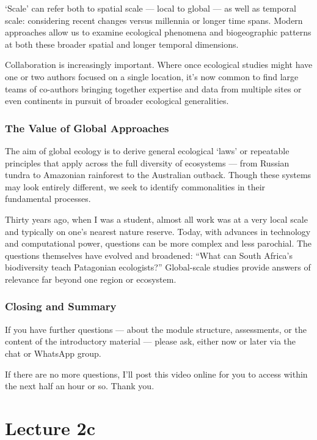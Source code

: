 \documentclass[
  12pt,
]{book}
\begin{document}
`Scale' can refer both to spatial scale --- local to global --- as well
as temporal scale: considering recent changes versus millennia or longer
time spans. Modern approaches allow us to examine ecological phenomena
and biogeographic patterns at both these broader spatial and longer
temporal dimensions.

Collaboration is increasingly important. Where once ecological studies
might have one or two authors focused on a single location, it's now
common to find large teams of co-authors bringing together expertise and
data from multiple sites or even continents in pursuit of broader
ecological generalities.

\subsection{The Value of Global
Approaches}\label{the-value-of-global-approaches}

The aim of global ecology is to derive general ecological `laws' or
repeatable principles that apply across the full diversity of ecosystems
--- from Russian tundra to Amazonian rainforest to the Australian
outback. Though these systems may look entirely different, we seek to
identify commonalities in their fundamental processes.

Thirty years ago, when I was a student, almost all work was at a very
local scale and typically on one's nearest nature reserve. Today, with
advances in technology and computational power, questions can be more
complex and less parochial. The questions themselves have evolved and
broadened: ``What can South Africa's biodiversity teach Patagonian
ecologists?'' Global-scale studies provide answers of relevance far
beyond one region or ecosystem.

\subsection{Closing and Summary}\label{closing-and-summary}

If you have further questions --- about the module structure,
assessments, or the content of the introductory material --- please ask,
either now or later via the chat or WhatsApp group.

If there are no more questions, I'll post this video online for you to
access within the next half an hour or so. Thank you.

\chapter*{Lecture 2c}\label{lecture-2c}
\end{document}
